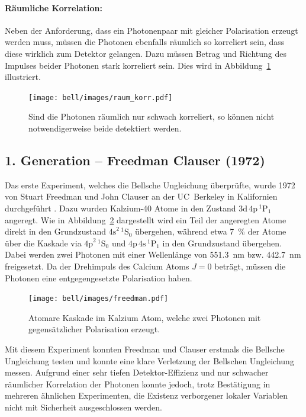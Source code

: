 \begin{refsection}
\paragraph{R\"aumliche Korrelation:}
Neben der Anforderung, dass ein Photonenpaar mit gleicher Polarisation erzeugt
werden muss, m\"ussen die Photonen ebenfalls r\"aumlich so korreliert sein,
dass diese wirklich zum Detektor gelangen.
Dazu m\"ussen Betrag und Richtung des Impulses beider Photonen stark korreliert
sein. Dies wird in Abbildung~\ref{fig:bell:raum_korr} illustriert.

\begin{figure}
    \centering
    \texttt{[image: bell/images/raum\_korr.pdf]}
    \caption{Sind die Photonen r\"aumlich nur schwach korreliert,
    so k\"onnen nicht notwendigerweise beide detektiert werden.}
    \label{fig:bell:raum_korr}
\end{figure}

\subsection{1. Generation -- Freedman Clauser (1972)}
Das erste Experiment, welches die Bellsche Ungleichung \"uberpr\"ufte,
wurde 1972 von Stuart Freedman und John Clauser an der UC~Berkeley
in Kalifornien durchgef\"uhrt \cite{Bell:Freedman1972}.
Dazu wurden Kalzium-40 Atome in den Zustand $\text{3d}\,\text{4p}\,^1\text{P}_1$
angeregt. 
Wie in Abbildung~\ref{fig:bell:freedman} dargestellt wird ein Teil der
angeregten Atome direkt in den Grundzustand $\text{4s}^2\,^1\text{S}_0$
\"ubergehen, w\"ahrend etwa \SI{7}{\percent} der Atome \"uber die Kaskade
via $\text{4p}^2\,^1\text{S}_0$ und $\text{4p}\,\text{4s}\,^1\text{P}_1$ 
in den Grundzustand \"ubergehen.
Dabei werden zwei Photonen mit einer Wellenl\"ange von \SI{551.3}{\nano\meter}
bzw. \SI{442.7}{\nano\meter} freigesetzt. 
Da der Drehimpuls des Calcium Atoms $J=0$ betr\"agt, m\"ussen die Photonen
eine entgegengesetzte Polarisation haben.

\begin{figure}
    \centering
    \texttt{[image: bell/images/freedman.pdf]}
    \caption{Atomare Kaskade im Kalzium Atom, welche zwei Photonen mit
    gegens\"atzlicher Polarisation erzeugt. \cite{Bell:Freedman1972}}
    \label{fig:bell:freedman}
\end{figure}

Mit diesem Experiment konnten Freedman und Clauser erstmals die Bellsche
Ungleichung testen und konnte eine klare Verletzung der Bellschen Ungleichung
messen.
Aufgrund einer sehr tiefen Detektor-Effizienz und nur schwacher r\"aumlicher
Korrelation der Photonen konnte jedoch, trotz Best\"atigung in mehreren 
\"ahnlichen Experimenten, die Existenz verborgener lokaler Variablen nicht
mit Sicherheit ausgeschlossen werden.


\end{refsection}
